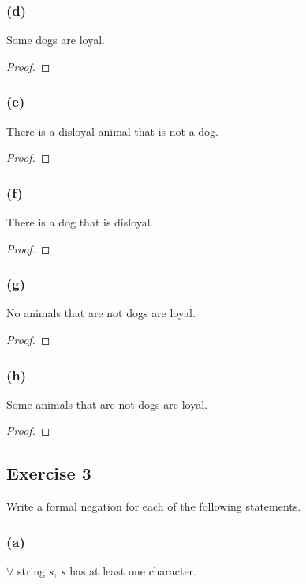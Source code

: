 \documentclass[14pt]{extarticle}
\newcommand{\fa}{\forall}
\begin{document}
\subsubsection{(d)}
Some dogs are loyal.

\begin{proof}

\end{proof}

\subsubsection{(e)}
There is a disloyal animal that is not a dog.

\begin{proof}

\end{proof}

\subsubsection{(f)}
There is a dog that is disloyal.

\begin{proof}

\end{proof}

\subsubsection{(g)}
No animals that are not dogs are loyal.

\begin{proof}

\end{proof}

\subsubsection{(h)}
Some animals that are not dogs are loyal.

\begin{proof}

\end{proof}

\subsection{Exercise 3}
Write a formal negation for each of the following statements.

\subsubsection{(a)}
$\fa$ string $s$, $s$ has at least one character.
\end{document}
